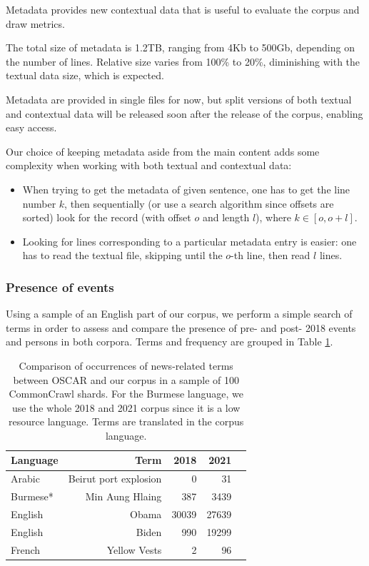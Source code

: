 Metadata provides new contextual data that is useful to evaluate the corpus and draw metrics.

The total size of metadata is 1.2TB, ranging from 4Kb to 500Gb, depending on the number of lines.
Relative size varies from 100\% to 20\%, diminishing with the textual data size, which is expected.

Metadata are provided in single files for now, but split versions of both textual and contextual data will be released soon after the release of the corpus, enabling easy access.

Our choice of keeping metadata aside from the main content adds some complexity when working with both textual and contextual data:

\begin{itemize}
    \item When trying to get the metadata of given sentence, one has to get the line number $k$, then sequentially (or use a search algorithm since offsets are sorted) look for the record (with offset $o$ and length $l$), where $k \in [o, o+l]$.
    \item Looking for lines corresponding to a particular metadata entry is easier: one has to read the textual file, skipping until the $o$-th line, then read $l$ lines.

\end{itemize}


\subsubsection{Presence of events}

Using a sample of an English part of our corpus, we perform a simple search of terms in order to assess and compare the presence of pre- and post- 2018 events and persons in both corpora. Terms and frequency are grouped in Table \ref{tab:word-frequency}.

\begin{table}[t]
    \centering\small
    \begin{tabular}{lrrrr}
        \toprule
        Language                  & Term                  & 2018  & 2021  \\
        \midrule
        \multirow{1}{*}{Arabic}   & Beirut port explosion & 0     & 31    \\
        \multirow{1}{*}{Burmese*} & Min Aung Hlaing       & 387   & 3439  \\
        \multirow{1}{*}{English}  & Obama                 & 30039 & 27639 \\
        \multirow{1}{*}{English}  & Biden                 & 990   & 19299 \\
        \multirow{1}{*}{French}   & Yellow Vests          & 2     & 96    \\
        \bottomrule
    \end{tabular}
    \caption{Comparison of occurrences of news-related terms between OSCAR and our corpus in a sample of 100 CommonCrawl shards. For the Burmese language, we use the whole 2018 and 2021 corpus since it is a low resource language. Terms are translated in the corpus language.}
    \label{tab:word-frequency}
\end{table}

